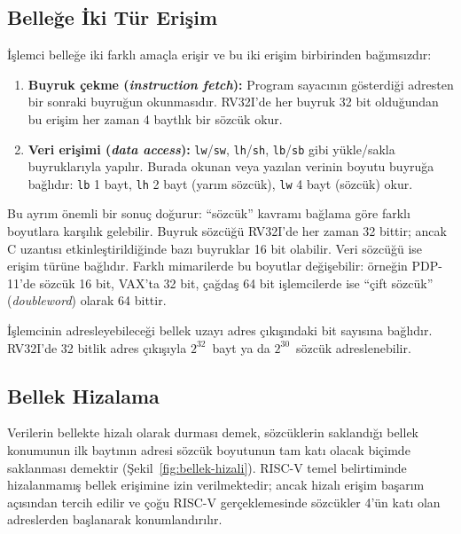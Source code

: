 \subsection{Belleğe İki Tür Erişim}
İşlemci belleğe iki farklı amaçla erişir ve bu iki erişim birbirinden bağımsızdır:

\begin{enumerate}[nosep]
\item \textbf{Buyruk çekme (\emph{instruction fetch}):} Program sayacının gösterdiği adresten bir sonraki buyruğun okunmasıdır. RV32I'de her buyruk 32 bit olduğundan bu erişim her zaman 4 baytlık bir sözcük okur.
\item \textbf{Veri erişimi (\emph{data access}):} \texttt{lw}/\texttt{sw}, \texttt{lh}/\texttt{sh}, \texttt{lb}/\texttt{sb} gibi yükle/sakla buyruklarıyla yapılır. Burada okunan veya yazılan verinin boyutu buyruğa bağlıdır: \texttt{lb} 1 bayt, \texttt{lh} 2 bayt (yarım sözcük), \texttt{lw} 4 bayt (sözcük) okur.
\end{enumerate}

Bu ayrım önemli bir sonuç doğurur: ``sözcük'' kavramı bağlama göre farklı boyutlara karşılık gelebilir. Buyruk sözcüğü RV32I'de her zaman 32 bittir; ancak C uzantısı etkinleştirildiğinde bazı buyruklar 16 bit olabilir. Veri sözcüğü ise erişim türüne bağlıdır. Farklı mimarilerde bu boyutlar değişebilir: örneğin PDP-11'de sözcük 16 bit, VAX'ta 32 bit, çağdaş 64 bit işlemcilerde ise ``çift sözcük'' (\emph{doubleword}) olarak 64 bittir.

İşlemcinin adresleyebileceği bellek uzayı adres çıkışındaki bit sayısına bağlıdır. RV32I'de 32 bitlik adres çıkışıyla $2^{32}$~bayt ya da $2^{30}$~sözcük adreslenebilir.

\subsection{Bellek Hizalama}
Verilerin bellekte hizalı olarak durması demek, sözcüklerin saklandığı bellek konumunun ilk baytının adresi sözcük boyutunun tam katı olacak biçimde saklanması demektir (Şekil~\ref{fig:bellek-hizali}). RISC-V temel belirtiminde hizalanmamış bellek erişimine izin verilmektedir; ancak hizalı erişim başarım açısından tercih edilir ve çoğu RISC-V gerçeklemesinde sözcükler 4'ün katı olan adreslerden başlanarak konumlandırılır.

